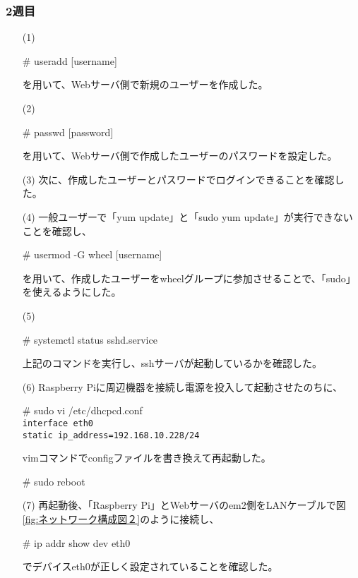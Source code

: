 \documentclass[12pt,a4paper]{jsarticle}
\numberwithin{equation}{section}
\numberwithin{figure}{section}
\numberwithin{table}{section}
\begin{document}
    \subsubsection{2週目}
    \begin{itemize}
      \item [(1)]\quad 
      \begin{screen}
        \# useradd [username]
      \end{screen}
      を用いて、Webサーバ側で新規のユーザーを作成した。
      \item [(2)]\quad
      \begin{screen}
        \# passwd [password]
      \end{screen}
      を用いて、Webサーバ側で作成したユーザーのパスワードを設定した。
      \item [(3)]次に、作成したユーザーとパスワードでログインできることを確認した。
      \item [(4)]一般ユーザーで「yum update」と「sudo yum update」が実行できないことを確認し、
      \begin{screen}
        \# usermod -G wheel [username]
      \end{screen}
      を用いて、作成したユーザーをwheelグループに参加させることで、「sudo」を使えるようにした。
      \item [(5)]\quad
      \begin{screen}
        \# systemctl status sshd.service
      \end{screen}
      上記のコマンドを実行し、sshサーバが起動しているかを確認した。
      \item [(6)]Raspberry Piに周辺機器を接続し電源を投入して起動させたのちに、
      \begin{screen}
        \# sudo vi /etc/dhcpcd.conf\\
        \verb|interface eth0|\\
        \verb|static ip_address=192.168.10.228/24|
      \end{screen}
      vimコマンドでconfigファイルを書き換えて再起動した。
      \begin{screen}
        \# sudo reboot
      \end{screen}
      \item [(7)]再起動後、「Raspberry Pi」とWebサーバのem2側をLANケーブルで図\ref{fig:ネットワーク構成図２}のように接続し、
      \begin{screen}
        \# ip addr show dev eth0
      \end{screen}
      でデバイスeth0が正しく設定されていることを確認した。

\end{itemize}
\end{document}
